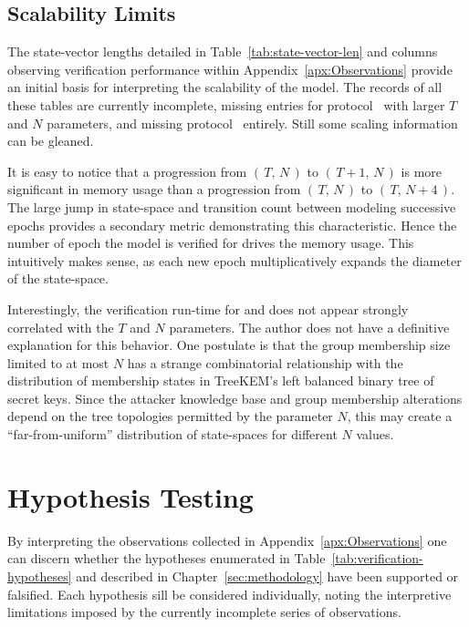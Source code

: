 \hypertarget{scalability-limits}{%
\subsection{Scalability Limits}\label{scalability-limits}}

The state-vector lengths detailed in Table\ \ref{tab:state-vector-len} and columns observing verification performance within Appendix\ \ref{apx:Observations} provide an initial basis for interpreting the scalability of the  model.
The records of all these tables are currently incomplete, missing entries for protocol \VersionOne\ with larger \(T\) and \(N\) parameters, and missing protocol \VersionTwo\ entirely.
Still some scaling information can be gleaned.

It is easy to notice that a progression from \( (\,T,\, N\,) \) to \( (\,T+1,\, N\,) \) is more significant in memory usage than a progression from \( (\,T,\, N\,) \) to \( (\,T,\, N+4\,) \).
The large jump in state-space and transition count between modeling successive epochs provides a secondary metric demonstrating this characteristic.
Hence the number of epoch the model is verified for drives the memory usage.
This intuitively makes sense, as each new epoch multiplicatively expands the diameter of the state-space.

Interestingly, the verification run-time for  and  does not appear strongly correlated with the \(T\) and \(N\) parameters.
The author does not have a definitive explanation for this behavior.
One postulate is that the group membership size limited to at most \(N\) has a strange combinatorial relationship with the distribution of membership states in TreeKEM's left balanced binary tree of secret keys.
Since the attacker knowledge base and group membership alterations depend on the tree topologies permitted by the parameter \(N\), this may create a ``far-from-uniform'' distribution of state-spaces for different \(N\) values.


\hypertarget{sec:hypothesis-outcomes}{%
\section{Hypothesis Testing}\label{sec:hypothesis-outcomes}}

By interpreting the observations collected in Appendix\ \ref{apx:Observations} one can discern whether the hypotheses enumerated in Table\ \ref{tab:verification-hypotheses} and described in Chapter\ \ref{sec:methodology} have been supported or falsified.
Each hypothesis sill be considered individually, noting the interpretive limitations imposed by the currently incomplete series of observations.


